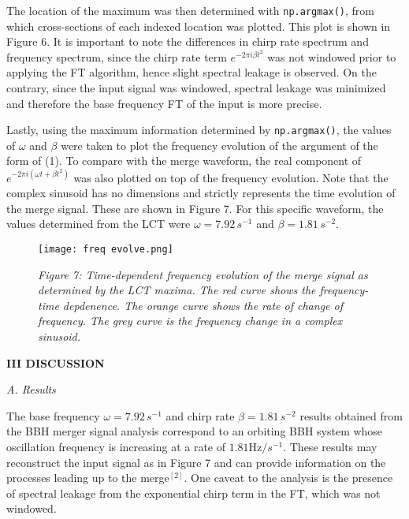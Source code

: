\documentclass[12pt]{article}
\begin{document}
\begin{multicols}{2}
\begin{spacing}{1.2}

    The location of the maximum was then determined with \verb!np.argmax()!, from which cross-sections of each indexed location was plotted. This plot is shown in Figure 6. It is important to note the differences in chirp rate spectrum and frequency spectrum, since the chirp rate term $e^{-2\pi i \beta t^2}$ was not windowed prior to applying the FT algorithm, hence slight spectral leakage is observed. On the contrary, since the input signal was windowed, spectral leakage was minimized and therefore the base frequency FT of the input is more precise. 

    Lastly, using the maximum information determined by \verb!np.argmax()!, the values of $\omega$ and $\beta$ were taken to plot the frequency evolution of the argument of the form of (1). To compare with the merge waveform, the real component of $e^{-2\pi i (\omega t + \beta t^2)}$ was also plotted on top of the frequency evolution. Note that the complex sinusoid has no dimensions and strictly represents the time evolution of the merge signal. These are shown in Figure 7. For this specific waveform, the values determined from the LCT were $\omega = 7.92\,s^{-1}$ and $\beta = 1.81 \, s^{-2}$. 

\end{spacing}


\begin{figure}[H]
    \centering
    \texttt{[image: freq evolve.png]}
    \caption*{\textit{Figure 7: Time-dependent frequency evolution of the merge signal as determined by the LCT maxima. The red curve shows the frequency-time depdenence. The orange curve shows the rate of change of frequency. The grey curve is the frequency change in a complex sinusoid.}}
\end{figure}




\begin{center}
    \textbf{III \hspace{5pt} DISCUSSION}

\vspace{10pt}

    \textit{A. Results}

\vspace{5pt}
\end{center}

The base frequency $\omega = 7.92 \,s^{-1}$ and chirp rate $\beta = 1.81 \, s^{-2}$ results obtained from the BBH merger signal analysis correspond to an orbiting BBH system whose oscillation frequency is increasing at a rate of $1.81 \text{Hz} / s^{-1}$. These results may reconstruct the input signal as in Figure 7 and can provide information on the processes leading up to the merge$^{[2]}$. One caveat to the analysis is the presence of spectral leakage from the exponential chirp term in the FT, which was not windowed. 




\end{multicols}
\end{document}

